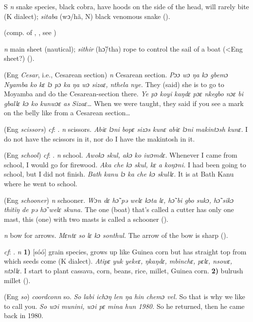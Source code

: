 \begin{letter}{S}
 \textit{n} snake species, black cobra, have hoods on the side of the head, will rarely bite (K dialect); \textit{sitaba} (wɔ/hã, N) black venomous snake (\citealt{Pichl1967}). 

 (comp. of , , see ) 

 \textit{n} main sheet (nautical); \textit{sithir} (hɔ̃/tha) rope to control the sail of a boat (<Eng sheet?) (\citealt{Pichl1967}). 

 (Eng \textit{Cesar}, i.e., Cesarean section) \textit{n} Cesarean section. \textit{Pɔɔ wɔ ŋa kɔ gbemɔ Nyamba ko kɛ lɔ pɔ ka ŋa wɔ sizaɛ, nthela nye.} They (said) she is to go to Moyamba and do the Cesarean-section there. \textit{Ye pɔ koyi kaŋdɛ pɔɛ nkegbo nɔɛ bi gballɛ kɔ ko kunwɔɛ as Sizaɛ…} When we were taught, they said if you see a mark on the belly like from a Cesarean section…

 (Eng \textit{scissors}) \textit{cf}: . \textit{n} scissors. \textit{Abiɛ lɔni bopɛ sizɔs kunɛ abiɛ lɔni makintɔsh kunɛ.} I do not have the scissors in it, nor do I have the makintosh in it.

 (Eng \textit{school}) \textit{cf}: . \textit{n} school. \textit{Awokɔ skul, akɔ ko iwɔmdɛ.} Whenever I came from school, I would go for firewood. \textit{Aka che kɔ skul, kɛ a koŋɔni.} I had been going to school, but I did not finish. \textit{Bath kanu lɔ ka che kɔ skullɛ.} It is at Bath Kanu where he went to school.

 (Eng \textit{schooner}) \textit{n} schooner. \textit{Wɔn dɛ hɔ̃ pə welɛ kɔta lɛ, hɔ̃ bi gbo sukɔ, hɔ̃ sikɔ thitïŋ de pə hɔ̃ welɛ skuna.} The one (boat) that's called a cutter has only one mast, this (one) with two masts is called a schooner (\citealt{Pichl1967}). 

 \textit{n} bow for arrows. \textit{Mɛntɛ so lɛ kɔ sonthul.} The arrow of the bow is sharp (\citealt{Pichl1967}). 

 \textit{cf}: . \textit{n} \textbf{1)} [sóó] grain species, grows up like Guinea corn but has straight top from which seeds come (K dialect). \textit{Atipɛ yuk yekeɛ, ŋkaŋdɛ, mbinchɛ, pɛlɛ, nsowɛ, ntɔllɛ.} I start to plant cassava, corn, beans, rice, millet, Guinea corn. \textbf{2)} bulrush millet (\citealt{Pichl1967}). 

 (Eng \textit{so}) \textit{coordconn} so. \textit{So labi ichɔŋ len ŋa hin chemɔ vel.} So that is why we like to call you. \textit{So wɔi munini, wɔi pɛ mina hun 1980.} So he returned, then he came back in 1980.


\end{letter}
